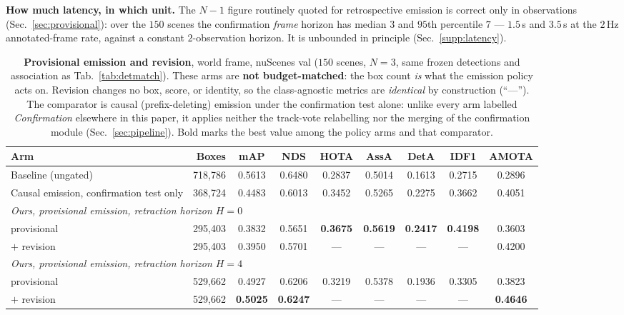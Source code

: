 \noindent\textbf{How much latency, in which unit.} The $N-1$ figure routinely
quoted for retrospective emission is correct only in observations
(Sec.~\ref{sec:provisional}): over the $150$ scenes the confirmation \emph{frame}
horizon has median $3$ and $95$th percentile $7$ --- $1.5$\,s and $3.5$\,s at
the $2$\,Hz annotated-frame rate, against a constant $2$-observation horizon.
It is unbounded in principle (Sec.~\ref{supp:latency}).

\begin{table}[t]
\centering\footnotesize
\setlength{\tabcolsep}{6pt}
\begin{tabular}{lrccccccc}
\toprule
Arm & Boxes & mAP & NDS & HOTA & AssA & DetA & IDF1 & AMOTA \\
\midrule
Baseline (ungated) & 718{,}786 & 0.5613 & 0.6480 & 0.2837 & 0.5014 & 0.1613 & 0.2715 & 0.2896 \\
Causal emission, confirmation test only & 368{,}724 & 0.4483 & 0.6013 & 0.3452 & 0.5265 & 0.2275 & 0.3662 & 0.4051 \\
\midrule
\multicolumn{9}{l}{\emph{Ours, provisional emission, retraction horizon $H{=}0$}} \\
\quad provisional & 295{,}403 & 0.3832 & 0.5651 & \textbf{0.3675} & \textbf{0.5619} & \textbf{0.2417} & \textbf{0.4198} & 0.3603 \\
\quad ${+}$ revision & 295{,}403 & 0.3950 & 0.5701 & --- & --- & --- & --- & 0.4200 \\
\midrule
\multicolumn{9}{l}{\emph{Ours, provisional emission, retraction horizon $H{=}4$}} \\
\quad provisional & 529{,}662 & 0.4927 & 0.6206 & 0.3219 & 0.5378 & 0.1936 & 0.3305 & 0.3823 \\
\quad ${+}$ revision & 529{,}662 & \textbf{0.5025} & \textbf{0.6247} & --- & --- & --- & --- & \textbf{0.4646} \\
\bottomrule
\end{tabular}
\caption{\textbf{Provisional emission and revision}, world frame, nuScenes val
($150$ scenes, $N{=}3$, same frozen detections and association as
Tab.~\ref{tab:detmatch}). These arms are \textbf{not budget-matched}: the box
count \emph{is} what the emission policy acts on. Revision changes no box,
score, or identity, so the class-agnostic metrics are \emph{identical} by
construction (``---''). The comparator is causal (prefix-deleting) emission
under the confirmation test alone: unlike every arm labelled \emph{Confirmation}
elsewhere in this paper, it applies neither the track-vote relabelling nor the
merging of the confirmation module (Sec.~\ref{sec:pipeline}). Bold marks the
best value among the policy arms and that comparator.}
\label{tab:policy}
\end{table}

